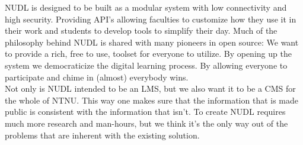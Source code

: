 \noindent
NUDL is designed to be built as a modular system with low connectivity and high security. Providing API's allowing faculties to customize how they use it in their work and students to develop tools to simplify their day. Much of the philosophy behind NUDL is shared with many pioneers in open source: We want to provide a rich, free to use, toolset for everyone to utilize. By opening up the system we democraticize the digital learning process. By allowing everyone to participate and chime in (almost) everybody wins. \\

\noindent
Not only is NUDL intended to be an LMS, but we also want it to be a CMS for the whole of NTNU. This way one makes sure that the information that is made public is consistent with the information that isn't. To create NUDL requires much more research and man-hours, but we think it's the only way out of the problems that are inherent with the existing solution.